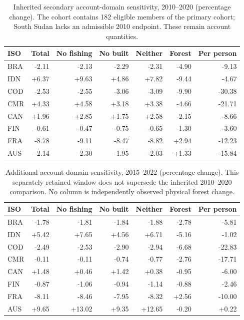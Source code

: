 \documentclass[11pt,a4paper]{article}
\begin{document}
\begin{table}[htbp]
\centering\small
\caption{Inherited secondary account-domain sensitivity, 2010--2020 (percentage change). The cohort contains 182 eligible members of the primary cohort; South Sudan lacks an admissible 2010 endpoint. These remain account quantities.}\label{tab:SI_account_sensitivity_2010_2020}
\begin{tabularx}{\textwidth}{lrrrrrr}\toprule
ISO & Total & No fishing & No built & Neither & Forest & Per person\\\midrule
BRA & -2.11 & -2.13 & -2.29 & -2.31 & -4.90 & -9.13\\
IDN & +6.37 & +9.63 & +4.86 & +7.82 & -9.44 & -4.67\\
COD & -2.53 & -2.55 & -3.06 & -3.09 & -9.90 & -30.38\\
CMR & +4.33 & +4.58 & +3.18 & +3.38 & -4.66 & -21.71\\
CAN & +1.96 & +2.85 & +1.75 & +2.58 & -2.15 & -8.66\\
FIN & -0.61 & -0.47 & -0.75 & -0.65 & -1.30 & -3.60\\
FRA & -8.78 & -9.11 & -8.47 & -8.82 & +2.94 & -12.23\\
AUS & -2.14 & -2.30 & -1.95 & -2.03 & +1.33 & -15.84\\
\bottomrule\end{tabularx}
\end{table}
\begin{table}[htbp]
\centering\small
\caption{Additional account-domain sensitivity, 2015--2022 (percentage change). This separately retained window does not supersede the inherited 2010--2020 comparison. No column is independently observed physical forest change.}\label{tab:SI_account_sensitivity_2015_2022}
\begin{tabularx}{\textwidth}{lrrrrrr}\toprule
ISO & Total & No fishing & No built & Neither & Forest & Per person\\\midrule
BRA & -1.78 & -1.81 & -1.84 & -1.88 & -2.78 & -5.81\\
IDN & +5.42 & +7.65 & +4.56 & +6.71 & -5.16 & -1.02\\
COD & -2.49 & -2.53 & -2.90 & -2.94 & -6.68 & -22.83\\
CMR & -0.11 & -0.11 & -0.74 & -0.77 & -2.76 & -17.71\\
CAN & +1.48 & +0.46 & +1.42 & +0.38 & -0.95 & -6.00\\
FIN & -0.87 & -1.06 & -0.94 & -1.14 & -0.88 & -2.46\\
FRA & -8.11 & -8.46 & -7.95 & -8.32 & +2.56 & -10.00\\
AUS & +9.65 & +13.02 & +9.35 & +12.65 & -0.20 & +0.22\\
\bottomrule\end{tabularx}
\end{table}
\end{document}
